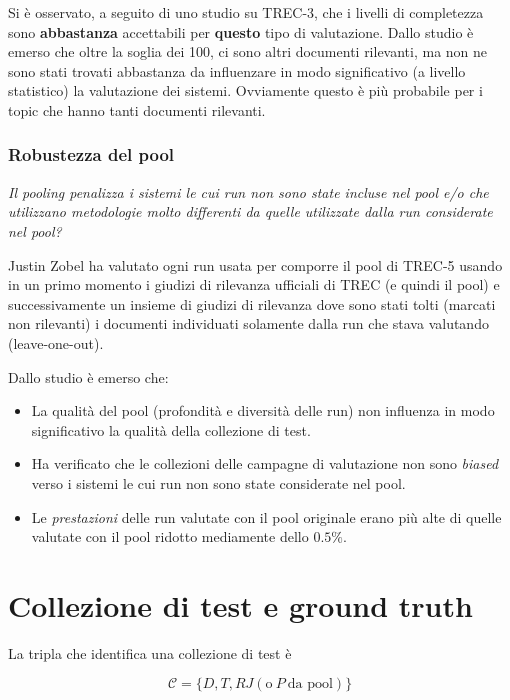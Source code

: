 Si è osservato, a seguito di uno studio su TREC-3, che i livelli di completezza sono \textbf{abbastanza} accettabili per \textbf{questo} tipo di valutazione.
Dallo studio è emerso che oltre la soglia dei 100, ci sono altri documenti rilevanti, ma non ne sono stati trovati abbastanza da influenzare in modo significativo (a livello statistico) la valutazione dei sistemi. Ovviamente questo è più probabile per i topic che hanno tanti documenti rilevanti.

\subsubsection{Robustezza del pool}

\begin{center}
\textit{Il pooling penalizza i sistemi le cui run non sono state incluse nel pool e/o che utilizzano metodologie molto differenti da quelle utilizzate dalla run considerate nel pool?}
\end{center}

Justin Zobel ha valutato ogni run usata per comporre il pool di TREC-5 usando in un primo momento i giudizi di rilevanza ufficiali di TREC (e quindi il pool) e successivamente un insieme di giudizi di rilevanza dove sono stati tolti (marcati non rilevanti) i documenti individuati solamente dalla run che stava valutando (leave-one-out).

Dallo studio è emerso che:

\begin{itemize}
	\item La qualità del pool (profondità e diversità delle run) non influenza in modo significativo la qualità della collezione di test.
	\item Ha verificato che le collezioni delle campagne di valutazione non sono \textit{biased} verso i sistemi le cui run non sono state considerate nel pool.
	\item Le \textit{prestazioni} delle run valutate con il pool originale erano più alte di quelle valutate con il pool ridotto mediamente dello $0.5\%$.
\end{itemize}

\section{Collezione di test e ground truth}

La tripla che identifica una collezione di test è

$$
\mathcal{C} = \{D, T, RJ (\text{o} \ P \ \text{da pool})\}
$$

